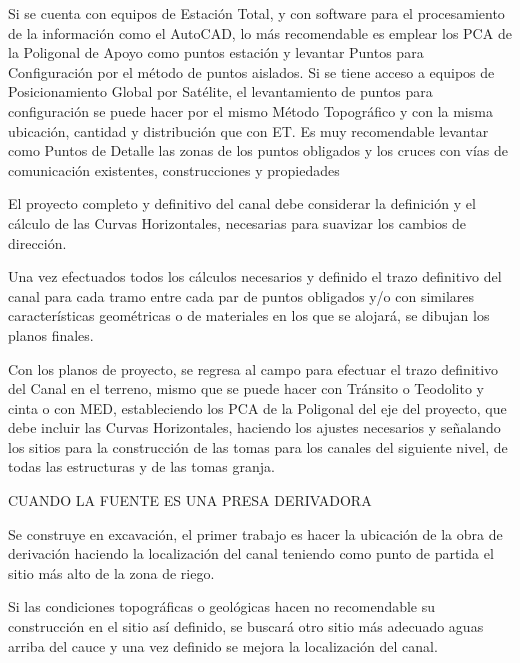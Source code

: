 Si se cuenta con equipos de Estación Total, y con software para el procesamiento de la información como el AutoCAD, lo más recomendable es emplear los PCA de la Poligonal de Apoyo como puntos estación y levantar Puntos para Configuración por el método de puntos aislados.
Si se tiene acceso a equipos de Posicionamiento Global por Satélite, el levantamiento de puntos para configuración se puede hacer por el mismo Método Topográfico y con la misma ubicación, cantidad y distribución que con ET.
Es muy recomendable levantar como Puntos de Detalle las zonas de los puntos obligados y los cruces con vías de comunicación existentes, construcciones y propiedades


El proyecto completo y definitivo del canal debe considerar la definición y el cálculo de las Curvas Horizontales, necesarias para suavizar los cambios de dirección.

Una vez efectuados todos los cálculos necesarios y definido el trazo definitivo del canal para cada tramo entre cada par de puntos obligados y/o con similares características geométricas o de materiales en los que se alojará, se dibujan los planos finales.

Con los planos de proyecto, se regresa al campo para efectuar el trazo definitivo del Canal en el terreno, mismo que se puede hacer con Tránsito o Teodolito y cinta o con MED, estableciendo los PCA de la Poligonal del eje del proyecto, que debe incluir las Curvas Horizontales, haciendo los ajustes necesarios y señalando los sitios para la construcción de las tomas para los canales del siguiente nivel, de todas las estructuras y de las tomas granja.

CUANDO LA FUENTE ES UNA PRESA DERIVADORA

Se construye en excavación, el primer trabajo es hacer la ubicación de la obra de derivación haciendo la localización del canal teniendo como punto de partida el sitio más alto de la zona de riego.

Si las condiciones topográficas o geológicas hacen no recomendable su construcción en el sitio así definido, se buscará otro sitio más adecuado aguas arriba del cauce y una vez definido se mejora la localización del canal.



























